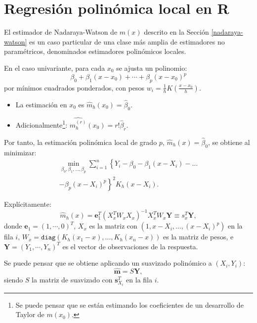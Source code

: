 \documentclass[
]{book}
\renewcommand{\boldsymbol}[1]{\symbf{#1}}
\renewcommand{\mathbf}[1]{\symbf{#1}}
\theoremstyle{break}
\theoremstyle{nonumberplain}
\let\oldfootnote\footnote
\renewcommand\footnote[1]{\oldfootnote{\hspace{2mm}#1}}
\begin{document}
\section{Regresión polinómica local en R}\label{locpol-r}

El estimador de Nadaraya-Watson de \(m(x)\) descrito en la Sección \ref{nadaraya-watson}
es un caso particular de una clase más amplia de estimadores no paramétricos,
denominados estimadores polinómicos locales.

En el caso univariante, para cada \(x_0\) se ajusta un polinomio:
\[\beta_0+\beta_{1}\left(x - x_0\right) + \cdots 
+ \beta_{p}\left( x-x_0\right)^{p}\]
por mínimos cuadrados ponderados, con pesos
\(w_{i} = \frac{1}{h}K\left(\frac{x-x_0}{h}\right)\).

\begin{itemize}
\item
  La estimación en \(x_0\) es \(\hat{m}_{h}(x_0)=\hat{\beta}_0\).
\item
  Adicionalmente\footnote{Se puede pensar que se están estimando los coeficientes de
    un desarrollo de Taylor de \(m(x_0)\).}:
  \(\widehat{m_{h}^{(r)}}(x_0) = r!\hat{\beta}_{r}\).
\end{itemize}

Por tanto, la estimación polinómica local de grado \(p\), \(\hat{m}_{h}(x)=\hat{\beta}_0\), se obtiene al minimizar:
\[\begin{aligned}
    \min_{\beta_0 ,\beta_1, \ldots, \beta_p}
    \sum_{i=1}^{n}\left\{ Y_{i} - \beta_0 
    -\beta_1(x - X_i) - \ldots \right. \nonumber \\
    \left. -\beta_p(x - X_i)^p \right\}^{2}
    K_{h}(x - X_i).
\end{aligned}\]

Explícitamente:
\[\hat{m}_{h}(x) = \mathbf{e}_{1}^{T} \left(
X_{x}^{T} {W}_{x} 
X_{x} \right)^{-1} X_{x}^{T} 
{W}_{x}\mathbf{Y} \equiv {s}_{x}^{T}\mathbf{Y},\]
donde \(\mathbf{e}_{1} = \left( 1, \cdots, 0\right)^{T}\), \(X_{x}\)
es la matriz con \((1,x - X_i, \ldots, (x - X_i)^p)\) en la fila \(i\),
\(W_{x} = \mathtt{diag} \left( K_{h}(x_{1} - x), \ldots, K_{h}(x_{n} - x) \right)\)
es la matriz de pesos, e \(\mathbf{Y} = \left( Y_1, \cdots, Y_n\right)^{T}\) es el vector de observaciones de la respuesta.

Se puede pensar que se obtiene aplicando un suavizado polinómico a
\((X_i, Y_i)\):
\[\hat{\boldsymbol{m}} = S\mathbf{Y},\]
siendo \(S\) la matriz de suavizado con \(\mathbf{s}_{X_{i}}^{T}\) en la fila \(i\).
\end{document}
